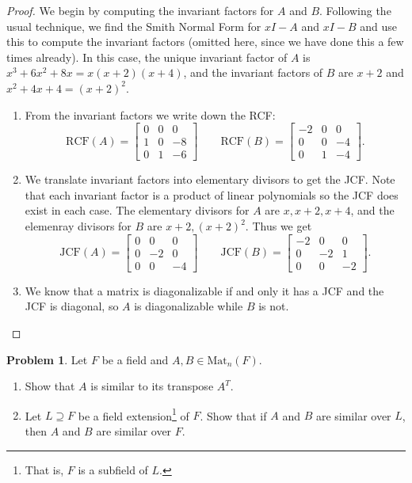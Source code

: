 \documentclass[11pt]{article}
\theoremstyle{definition}
\newtheorem{problem}{Problem}
\begin{document}
\begin{proof}
We begin by computing the invariant factors for $A$ and $B$. Following the usual technique, we find the Smith Normal Form for $xI-A$ and $xI-B$ and use this to compute the invariant factors (omitted here, since we have done this a few times already). In this case, the unique invariant factor of $A$ is $x^3+6x^2+8x=x(x+2)(x+4)$, and the invariant factors of $B$ are $x+2$ and $x^2+4x+4=(x+2)^2$.
\begin{enumerate}
\item[(a)] From the invariant factors we write down the RCF:
\[ \mathrm{RCF}(A) = \begin{bmatrix} 0 & 0 & 0 \\ 1 & 0 & -8 \\ 0 & 1 & -6\end{bmatrix} \qquad  \mathrm{RCF}(B) = \begin{bmatrix} -2 & 0 & 0 \\ 0 & 0 & -4 \\ 0 & 1 & -4 \end{bmatrix} .\]
\item[(b)] We translate invariant factors into elementary divisors to get the JCF. Note that each invariant factor is a product of linear polynomials so the JCF does exist in each case. The elementary divisors for $A$ are $x, x+2, x+4$, and the elemenray divisors for $B$ are $x+2, (x+2)^2$. Thus we get
\[ \mathrm{JCF}(A) = \begin{bmatrix} 0 & 0 & 0 \\ 0 & -2 & 0 \\ 0 & 0 & -4 \end{bmatrix} \qquad  \mathrm{JCF}(B) = \begin{bmatrix} -2 & 0 & 0 \\ 0 & -2 & 1 \\ 0 & 0 & -2 \end{bmatrix} .\]
\item[(c)] We know that a matrix is diagonalizable if and only it has a JCF and the JCF is diagonal, so $A$ is diagonalizable while $B$ is not.
\end{enumerate}


\end{proof}


\begin{problem}
Let $F$ be a field and $A,B\in \mathrm{Mat}_{n}(F)$.
\begin{enumerate}
\item[(a)] Show that $A$ is similar to its transpose $A^T$.
\item[(b)] Let $L\supseteq F$ be a field extension\footnote{That is, $F$ is a subfield of $L$.} of $F$. Show that if $A$ and $B$ are similar over $L$, then $A$ and $B$ are similar over $F$.
\end{enumerate}
\end{problem}
\end{document}
